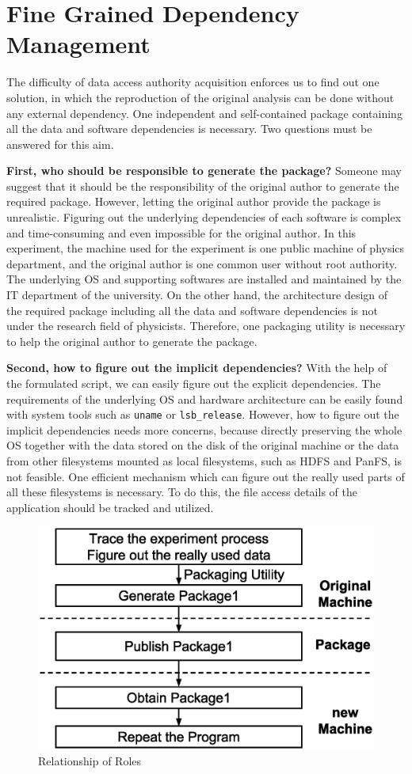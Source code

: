 \documentclass{sig-alternate}
\begin{document}
\section{Fine Grained Dependency Management}

The difficulty of data access authority acquisition enforces us to find out one
solution, in which the reproduction of the original analysis can be done
without any external dependency. One independent and self-contained
package containing all the data and software dependencies is necessary. 
Two questions must be answered for this aim. 

{\bf First, who should be responsible to generate the package?}
Someone may suggest that it should be the responsibility of the original author
to generate the required package. However, letting the original author provide
the package is unrealistic. 
Figuring out the underlying dependencies of
each software is complex and time-consuming and even impossible for the
original author. In this experiment, the machine used for the experiment is one
public machine of physics department, and the original author is one common user without
root authority. The underlying OS and supporting softwares are installed and
maintained by the IT department of the university. On the other hand, the
architecture design of the required package including all the data and software
dependencies is not under the research field of physicists.
Therefore, one packaging utility is necessary to help the original author to generate the package.

{\bf Second, how to figure out the implicit dependencies?}
With the help of the formulated script, we can easily figure out the explicit dependencies.
The requirements of the underlying OS and hardware
architecture can be easily found with system tools such as {\tt uname} or
{\tt lsb\_release}.
However, how to figure out the implicit dependencies needs more concerns, because
directly preserving the whole OS together with the data
stored on the disk of the original machine or the data from other filesystems
mounted as local filesystems, such as HDFS and PanFS, is not feasible. One
efficient mechanism which can figure out the really used parts of all these
filesystems is necessary. 
To do this, the file access details of the application should be tracked and utilized.

\begin{figure}
\centering
\includegraphics[width=.8\columnwidth]{solution3.eps}
\caption{Relationship of Roles}
\label{fig:solution3}
\end{figure}
\end{document}
